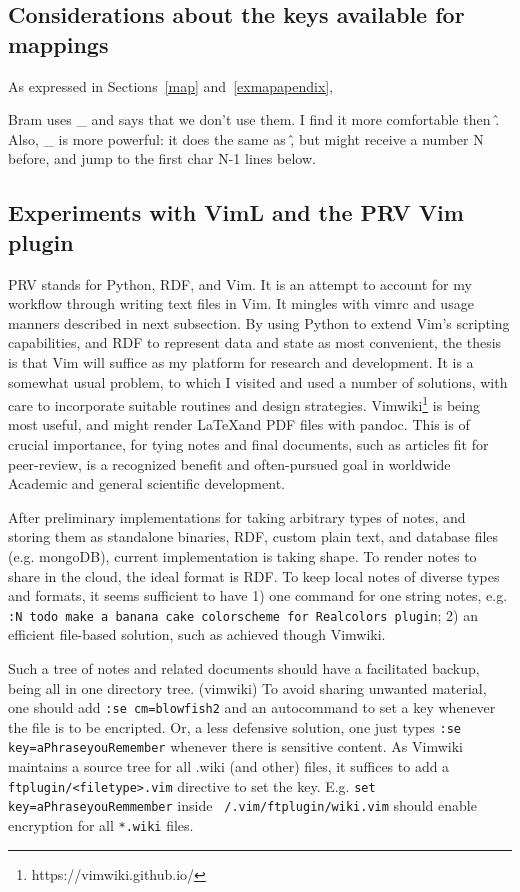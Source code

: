 \documentclass{article}
\newcommand{\tttt}[1]{\texttt{#1}}
\begin{document}
\subsection{Considerations about the keys available for mappings}
As expressed in Sections~\ref{map} and~\ref{exmapapendix},

Bram uses \_ and says that we don't use them.
I find it more comfortable then \^.
Also, \_ is more powerful: it does the same as \^,
but might receive a number N before, and jump to
the first char N-1 lines below.

\subsection{Experiments with VimL and the PRV Vim plugin}
PRV stands for Python, RDF, and Vim.
It is an attempt to account for my workflow through
writing text files in Vim.
It mingles with vimrc and usage manners described in next subsection.
By using Python to extend Vim's scripting capabilities, and RDF
to represent data and state as most convenient,
the thesis is that Vim will suffice as my platform for research and
development.
It is a somewhat usual problem, to which I visited and used a number
of solutions,
with care to incorporate suitable routines and design strategies.
Vimwiki\footnote{https://vimwiki.github.io/} is being most useful,
and might render \LaTeX and PDF files with pandoc.
This is of crucial importance, for tying notes and final documents,
such as articles fit for peer-review, is a recognized benefit and
often-pursued goal in worldwide Academic and general scientific
development.

After preliminary implementations for taking arbitrary types of notes,
and storing them as standalone binaries, RDF, custom plain text, and
database files (e.g. mongoDB),
current implementation is taking shape.
To render notes to share in the cloud, the ideal format is RDF.
To keep local notes of diverse types and formats,
it seems sufficient to have 1) one command for one string notes,
e.g. \tttt{:N todo make a banana cake colorscheme for Realcolors
plugin};
2) an efficient file-based solution, such as achieved though Vimwiki.

Such a tree of notes and related documents should have a facilitated
backup, being all in one directory tree. (vimwiki)
To avoid sharing unwanted material, one should add
\tttt{:se cm=blowfish2} and an autocommand to set a key
whenever the file is to be encripted.
Or, a less defensive solution, one just types \tttt{:se
key=aPhraseyouRemember} whenever there is sensitive content.
As Vimwiki maintains a source tree for all .wiki (and other) files,
it suffices to add a \tttt{ftplugin/<filetype>.vim} directive
to set the key. E.g. \tttt{set key=aPhraseyouRemmember} inside
\tttt{~/.vim/ftplugin/wiki.vim} should enable encryption for all
\tttt{*.wiki} files.
\end{document}
